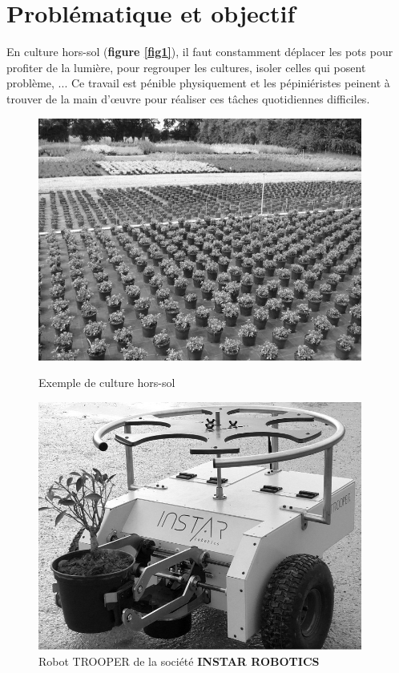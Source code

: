 \renewcommand{\sectionbreak}{}
\section{Problématique et objectif}

En culture hors-sol (\textbf{figure \ref{fig1}}), il faut constamment déplacer
les pots pour profiter de la lumière, pour regrouper les cultures,
isoler celles qui posent problème, ... Ce travail est pénible physiquement et les pépiniéristes peinent à trouver de la main d'œuvre
pour réaliser ces tâches quotidiennes difficiles.

\begin{figure}[!htb]
\begin{minipage}{0.5\textwidth}
\begin{center}
\includegraphics[width=0.95\textwidth]{images/image1.jpg}
\caption{Exemple de culture hors-sol  \label{fig1}}
\end{center}
\end{minipage}
\begin{minipage}{0.5\textwidth}
\begin{center}
\includegraphics[width=0.95\textwidth]{images/image2.jpg}
\caption{Robot TROOPER de la société \textbf{INSTAR ROBOTICS} \label{fig2}}
\end{center}
\end{minipage}
\end{figure}


